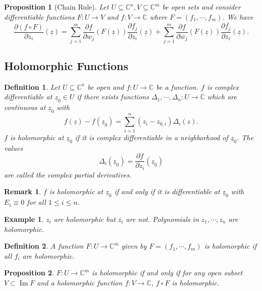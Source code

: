 \documentclass{article}
\newtheorem{proposition}{Proposition}[section]
\newtheorem{definition}{Definition}[section]
\newtheorem{remark}{Remark}[section]
\newtheorem{example}{Example}[section]
\DeclareMathOperator{\Image}{Im}
\newcommand{\C}[0]{\mathbb{C}}
\newcommand{\pd}[2]{{\frac {\partial#1} {\partial#2}}}
\begin{document}
\begin{proposition}[Chain Rule]
Let $U\subseteq\C^n,V\subseteq\C^m$ be open sets and consider differentiable functions $F:U\to V$ and $f:V\to \C$ where $F=(f_1,\cdots,f_m)$. We have
\begin{equation*}
\pd{(f\circ F)}{z_i}(\underline{z}) = \sum_{j=1}^m\pd{f}{w_j}(F(\underline{z}))\pd{f_j}{z_i}(\underline{z})+ \sum_{j=1}^m\pd{f}{\overline{w_j}}(F(\underline{z}))\pd{\overline{f_j}}{z_i}(\underline{z}).
\end{equation*}
\label{chain_rule}
\end{proposition}

\subsection{Holomorphic Functions}

\begin{definition}
Let $U\subseteq\C^n$ be open and $f:U\to \C$ be a function. $f$ is complex differentiable at $\underline{z}_0\in U$ if there exists functions $\Delta_1,\cdots,\Delta_n:U\to\C$ which are continuous at $\underline{z}_0$ with
\begin{equation*}
f(\underline{z})-f(\underline{z}_0) = \sum_{i=1}^n(z_i-z_{0,i})\Delta_i(z).
\end{equation*}
$f$ is holomorphic at $\underline{z}_0$ if it is complex differentiable in a neighborhood of $\underline{z}_0$. The values
\begin{equation*}
\Delta_i(\underline{z}_0)=\pd{f}{z_i}(\underline{z}_0)
\end{equation*}
are called the complex partial derivatives. 
\end{definition}

\begin{remark}
$f$ is holomorphic at $\underline{z}_0$ if and only if it is differentiable at $\underline{z}_0$ with $E_i\equiv0$ for all $1\leq i\leq n$.
\end{remark}

\begin{example}
$z_i$ are holomorphic but $\overline{z_i}$ are not. Polynomials in $z_1,\cdots,z_n$ are holomorphic.
\end{example}

\begin{definition}
A function $F:U\to\C^m$ given by $F=(f_1,\cdots,f_m)$ is holomorphic if all $f_i$ are holomorphic.
\end{definition}

\begin{proposition}
  \label{proposition_holomorphic_equivalent}
$F:U\to\C^m$ is holomorphic if and only if for any open subset $V\subset\Image F$ and a holomorphic function $f:V\to\C$, $f\circ F$ is holomorphic.
\end{proposition}
\end{document}
